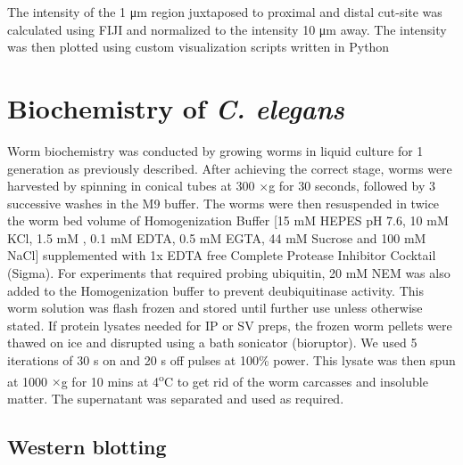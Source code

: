 The intensity of the 1 μm region juxtaposed to proximal and distal cut-site was calculated using FIJI and normalized to the intensity 10 μm away. The intensity was then plotted using custom visualization scripts written in Python

\section{Biochemistry of \textit{C. elegans}}

Worm biochemistry was conducted by growing worms in liquid culture for 1 generation as previously described. After achieving the correct stage, worms were harvested by spinning in conical tubes at 300 $\times$g for 30 seconds, followed by 3 successive washes in the M9 buffer. The worms were then resuspended in twice the worm bed volume of Homogenization Buffer [15 mM HEPES pH 7.6, 10 mM KCl, 1.5 mM , 0.1 mM EDTA, 0.5 mM EGTA, 44 mM Sucrose and 100 mM NaCl] supplemented with 1x EDTA free Complete Protease Inhibitor Cocktail (Sigma). For experiments that required probing ubiquitin, 20 mM NEM was also added to the Homogenization buffer to prevent deubiquitinase activity. This worm solution was flash frozen and stored until further use unless otherwise stated. If protein lysates needed for IP or SV preps, the frozen worm pellets were thawed on ice and disrupted using a bath sonicator (bioruptor). We used 5 iterations of 30 s on and 20 s off pulses at 100\% power. This lysate was then spun at 1000 $\times$g for 10 mins at 4\textsuperscript{o}C to get rid of the worm carcasses and insoluble matter. The supernatant was separated and used as required.

\subsection{Western blotting}

